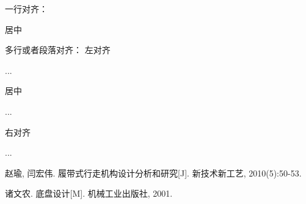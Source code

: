 
一行对齐： \centerline{居中} 
多行或者段落对齐：
左对齐 \begin{flushleft}...\end{flushleft}
居中 \begin{center}...\end{center}
右对齐 \begin{flushright}...\end{flushright}


\begin{thebibliography}{0}
		赵瑜, 闫宏伟. 履带式行走机构设计分析和研究[J]. 新技术新工艺, 2010(5):50-53.
		
		诸文农. 底盘设计[M]. 机械工业出版社, 2001.
	
\end{thebibliography}